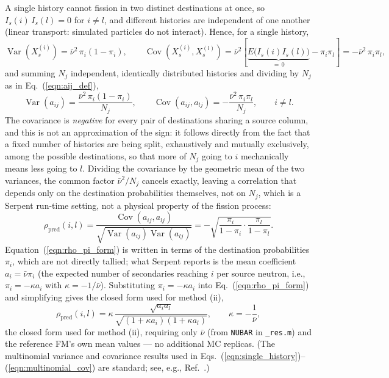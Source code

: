\documentclass{style/nseJournal}
\begin{document}
A single history cannot fission in two distinct destinations at once, so $I_s(i)\,I_s(l)=0$ for $i\neq l$, and different histories are independent of one another (linear transport: simulated particles do not interact). Hence, for a single history,
\begin{equation}
  \operatorname{Var}\left(X_s^{(i)}\right) = \bar\nu^2\,\pi_i(1-\pi_i), \qquad
  \operatorname{Cov}\left(X_s^{(i)},X_s^{(l)}\right) = \bar\nu^2\left[\underbrace{E\big(I_s(i)I_s(l)\big)}_{=\,0} - \pi_i\pi_l\right] = -\bar\nu^2\,\pi_i\pi_l ,
  \label{eqn:single_history}
\end{equation}
and summing $N_j$ independent, identically distributed histories and dividing by $N_j$ as in Eq.~(\ref{eqn:aij_def}),
\begin{equation}
  \operatorname{Var}(a_{ij}) = \frac{\bar\nu^2\,\pi_i(1-\pi_i)}{N_j}, \qquad
  \operatorname{Cov}(a_{ij},a_{lj}) = -\frac{\bar\nu^2\,\pi_i\pi_l}{N_j}, \qquad i\neq l .
  \label{eqn:multinomial_cov}
\end{equation}
The covariance is \emph{negative} for every pair of destinations sharing a source column, and this is not an approximation of the sign: it follows directly from the fact that a fixed number of histories are being split, exhaustively and mutually exclusively, among the possible destinations, so that more of $N_j$ going to $i$ mechanically means less going to $l$. Dividing the covariance by the geometric mean of the two variances, the common factor $\bar\nu^2/N_j$ cancels exactly, leaving a correlation that depends only on the destination probabilities themselves, not on $N_j$, which is a Serpent run-time setting, not a physical property of the fission process:
\begin{equation}
  \rho_{\text{pred}}(i,l) = \frac{\operatorname{Cov}(a_{ij},a_{lj})}{\sqrt{\operatorname{Var}(a_{ij})\operatorname{Var}(a_{lj})}}
  = -\sqrt{\frac{\pi_i}{1-\pi_i}\cdot\frac{\pi_l}{1-\pi_l}} .
  \label{eqn:rho_pi_form}
\end{equation}
Equation~(\ref{eqn:rho_pi_form}) is written in terms of the destination probabilities $\pi_i$, which are not directly tallied; what Serpent reports is the mean coefficient $a_i = \bar\nu\pi_i$ (the expected number of secondaries reaching $i$ per source neutron, i.e., $\pi_i = -\kappa a_i$ with $\kappa=-1/\bar\nu$). Substituting $\pi_i=-\kappa a_i$ into Eq.~(\ref{eqn:rho_pi_form}) and simplifying gives the closed form used for method (ii),
\begin{equation}
  \rho_{\text{pred}}(i,l) = \kappa\,\frac{\sqrt{a_i a_l}}{\sqrt{(1+\kappa a_i)(1+\kappa a_l)}}, \qquad \kappa=-\frac{1}{\bar\nu},
  \label{eqn:rho_pred}
\end{equation}
the closed form used for method (ii), requiring only $\bar\nu$ (from \texttt{NUBAR} in \texttt{\_res.m}) and the reference FM's own mean values --- no additional MC replicas. (The multinomial variance and covariance results used in Eqs.~(\ref{eqn:single_history})--(\ref{eqn:multinomial_cov}) are standard; see, e.g., Ref.~\cite{CasellaBerger2002}.)
\end{document}
